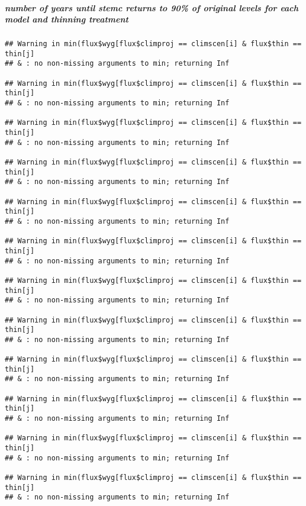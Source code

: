 \documentclass[]{article}
\let\oldsubparagraph\subparagraph
\renewcommand{\subparagraph}[1]{\oldsubparagraph{#1}\mbox{}}
\begin{document}
\subparagraph{number of years until stemc returns to 90\% of original
levels for each model and thinning
treatment}\label{number-of-years-until-stemc-returns-to-90-of-original-levels-for-each-model-and-thinning-treatment}

\begin{verbatim}
## Warning in min(flux$wyg[flux$climproj == climscen[i] & flux$thin == thin[j]
## & : no non-missing arguments to min; returning Inf

## Warning in min(flux$wyg[flux$climproj == climscen[i] & flux$thin == thin[j]
## & : no non-missing arguments to min; returning Inf

## Warning in min(flux$wyg[flux$climproj == climscen[i] & flux$thin == thin[j]
## & : no non-missing arguments to min; returning Inf

## Warning in min(flux$wyg[flux$climproj == climscen[i] & flux$thin == thin[j]
## & : no non-missing arguments to min; returning Inf

## Warning in min(flux$wyg[flux$climproj == climscen[i] & flux$thin == thin[j]
## & : no non-missing arguments to min; returning Inf

## Warning in min(flux$wyg[flux$climproj == climscen[i] & flux$thin == thin[j]
## & : no non-missing arguments to min; returning Inf

## Warning in min(flux$wyg[flux$climproj == climscen[i] & flux$thin == thin[j]
## & : no non-missing arguments to min; returning Inf

## Warning in min(flux$wyg[flux$climproj == climscen[i] & flux$thin == thin[j]
## & : no non-missing arguments to min; returning Inf

## Warning in min(flux$wyg[flux$climproj == climscen[i] & flux$thin == thin[j]
## & : no non-missing arguments to min; returning Inf

## Warning in min(flux$wyg[flux$climproj == climscen[i] & flux$thin == thin[j]
## & : no non-missing arguments to min; returning Inf

## Warning in min(flux$wyg[flux$climproj == climscen[i] & flux$thin == thin[j]
## & : no non-missing arguments to min; returning Inf

## Warning in min(flux$wyg[flux$climproj == climscen[i] & flux$thin == thin[j]
## & : no non-missing arguments to min; returning Inf
\end{verbatim}
\end{document}

